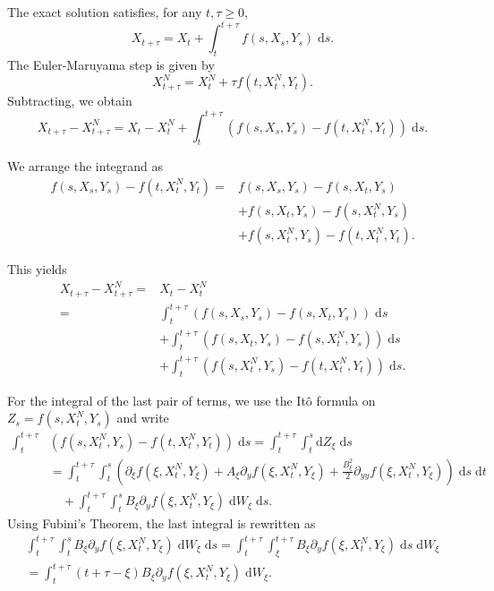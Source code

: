 \documentclass[reqno,12pt]{amsart}
\theoremstyle{plain}%
\theoremstyle{definition}
\begin{document}
The exact solution satisfies, for any $t, \tau \geq 0$, 
$$
X_{t + \tau} = X_t + \int_t^{t + \tau} f(s, X_s, Y_s) \;\mathrm{d}s.
$$
The Euler-Maruyama step is given by
$$
X_{t+\tau}^N = X_t^N + \tau f(t, X_t^N, Y_t).
$$
Subtracting, we obtain
$$
X_{t + \tau} - X_{t + \tau}^N = X_t - X_t^N + \int_t^{t + \tau} \left( f(s, X_s, Y_s) - f(t, X_t^N, Y_t) \right)\;\mathrm{d}s.
$$

We arrange the integrand as
\begin{align*}
f(s, X_s, Y_s) - f(t, X_t^N, Y_t) = & f(s, X_s, Y_s) - f(s, X_t, Y_s) \\ 
 & + f(s, X_t, Y_s) - f(s, X_t^N, Y_s) \\
 & + f(s, X_t^N, Y_s) - f(t, X_t^N, Y_t).
\end{align*}

This yields
\begin{align*}
X_{t + \tau} - X_{t + \tau}^N  = & X_t - X_t^N \\
= &  \int_t^{t + \tau} \left( f(s, X_s, Y_s) - f(s, X_t, Y_s) \right)\;\mathrm{d}s \\ 
 & + \int_t^{t + \tau} \left( f(s, X_t, Y_s) - f(s, X_t^N, Y_s) \right)\;\mathrm{d}s \\
 & + \int_t^{t + \tau} \left( f(s, X_t^N, Y_s) - f(t, X_t^N, Y_t) \right)\;\mathrm{d}s.
\end{align*}

For the integral of the last pair of terms, we use the It\^o formula on $Z_s = f(s, X_t^N, Y_s)$ and write
\begin{align*}
\int_t^{t + \tau} & \left(f(s, X_t^N, Y_s) - f(t, X_t^N, Y_t) \right)\;\mathrm{d}s  = \int_t^{t + \tau} \int_t^s \mathrm{d}Z_\xi \;\mathrm{d}s \\
& = \int_t^{t + \tau} \int_t^s \left(\partial_\xi f(\xi, X_t^N, Y_\xi) + A_\xi \partial_y f(\xi, X_t^N, Y_\xi)  + \frac{B_\xi^2}{2}\partial_{yy}f(\xi, X_t^N, Y_\xi) \right) \;\mathrm{d}s\;\mathrm{d}t \\ 
& \quad + \int_t^{t + \tau} \int_t^s B_\xi \partial_y f(\xi, X_t^N, Y_\xi)\;\mathrm{d}W_\xi\;\mathrm{d}s.
\end{align*}
Using Fubini's Theorem, the last integral is rewritten as
\begin{multline}
\label{fubini}
\int_t^{t + \tau} \int_t^s B_\xi \partial_y f(\xi, X_t^N, Y_\xi)\;\mathrm{d}W_\xi\;\mathrm{d}s 
  = \int_t^{t + \tau} \int_\xi^{t + \tau} B_\xi \partial_y f(\xi, X_t^N, Y_\xi) \;\mathrm{d}s \;\mathrm{d}W_\xi \\
  = \int_t^{t+\tau} (t + \tau - \xi) B_\xi \partial_y f(\xi, X_t^N, Y_\xi) \;\mathrm{d}W_\xi.
\end{multline}
\end{document}
